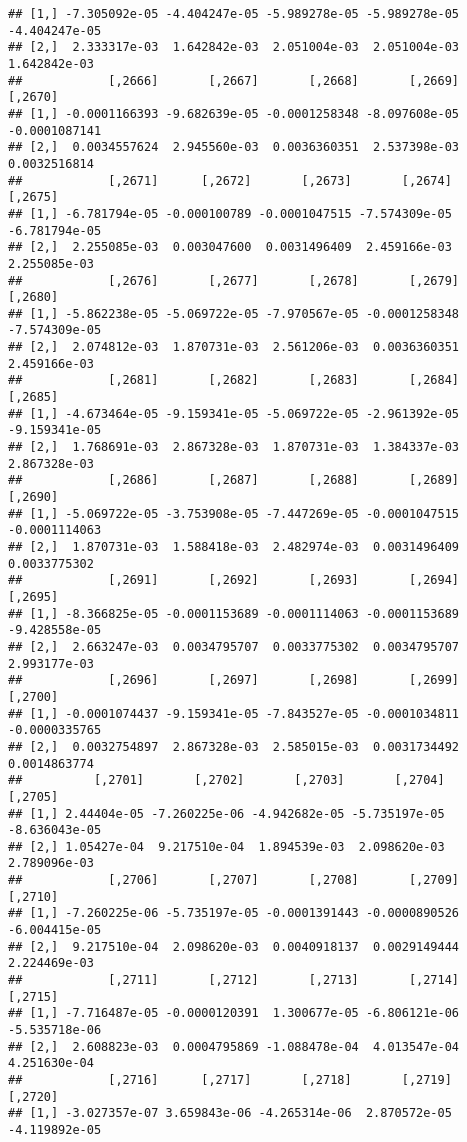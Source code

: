 \documentclass[
]{article}
\begin{document}
\begin{verbatim}
## [1,] -7.305092e-05 -4.404247e-05 -5.989278e-05 -5.989278e-05 -4.404247e-05
## [2,]  2.333317e-03  1.642842e-03  2.051004e-03  2.051004e-03  1.642842e-03
##            [,2666]       [,2667]       [,2668]       [,2669]       [,2670]
## [1,] -0.0001166393 -9.682639e-05 -0.0001258348 -8.097608e-05 -0.0001087141
## [2,]  0.0034557624  2.945560e-03  0.0036360351  2.537398e-03  0.0032516814
##            [,2671]      [,2672]       [,2673]       [,2674]       [,2675]
## [1,] -6.781794e-05 -0.000100789 -0.0001047515 -7.574309e-05 -6.781794e-05
## [2,]  2.255085e-03  0.003047600  0.0031496409  2.459166e-03  2.255085e-03
##            [,2676]       [,2677]       [,2678]       [,2679]       [,2680]
## [1,] -5.862238e-05 -5.069722e-05 -7.970567e-05 -0.0001258348 -7.574309e-05
## [2,]  2.074812e-03  1.870731e-03  2.561206e-03  0.0036360351  2.459166e-03
##            [,2681]       [,2682]       [,2683]       [,2684]       [,2685]
## [1,] -4.673464e-05 -9.159341e-05 -5.069722e-05 -2.961392e-05 -9.159341e-05
## [2,]  1.768691e-03  2.867328e-03  1.870731e-03  1.384337e-03  2.867328e-03
##            [,2686]       [,2687]       [,2688]       [,2689]       [,2690]
## [1,] -5.069722e-05 -3.753908e-05 -7.447269e-05 -0.0001047515 -0.0001114063
## [2,]  1.870731e-03  1.588418e-03  2.482974e-03  0.0031496409  0.0033775302
##            [,2691]       [,2692]       [,2693]       [,2694]       [,2695]
## [1,] -8.366825e-05 -0.0001153689 -0.0001114063 -0.0001153689 -9.428558e-05
## [2,]  2.663247e-03  0.0034795707  0.0033775302  0.0034795707  2.993177e-03
##            [,2696]       [,2697]       [,2698]       [,2699]       [,2700]
## [1,] -0.0001074437 -9.159341e-05 -7.843527e-05 -0.0001034811 -0.0000335765
## [2,]  0.0032754897  2.867328e-03  2.585015e-03  0.0031734492  0.0014863774
##          [,2701]       [,2702]       [,2703]       [,2704]       [,2705]
## [1,] 2.44404e-05 -7.260225e-06 -4.942682e-05 -5.735197e-05 -8.636043e-05
## [2,] 1.05427e-04  9.217510e-04  1.894539e-03  2.098620e-03  2.789096e-03
##            [,2706]       [,2707]       [,2708]       [,2709]       [,2710]
## [1,] -7.260225e-06 -5.735197e-05 -0.0001391443 -0.0000890526 -6.004415e-05
## [2,]  9.217510e-04  2.098620e-03  0.0040918137  0.0029149444  2.224469e-03
##            [,2711]       [,2712]       [,2713]       [,2714]       [,2715]
## [1,] -7.716487e-05 -0.0000120391  1.300677e-05 -6.806121e-06 -5.535718e-06
## [2,]  2.608823e-03  0.0004795869 -1.088478e-04  4.013547e-04  4.251630e-04
##            [,2716]      [,2717]       [,2718]       [,2719]       [,2720]
## [1,] -3.027357e-07 3.659843e-06 -4.265314e-06  2.870572e-05 -4.119892e-05

\end{verbatim}
\end{document}
